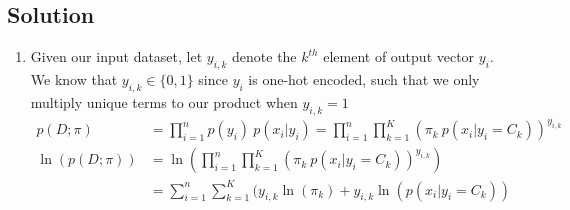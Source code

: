 \documentclass[submit]{harvardml}
\begin{document}
\subsection*{Solution}
\begin{enumerate}
    \item Given our input dataset, let $y_{i,k}$ denote the $k^{th}$ element of output vector $y_i$. We know that $y_{i,k} \in \{0, 1\}$ since $y_i$ is one-hot encoded, such that we only multiply unique terms to our product when  $y_{i,k}=1$
    \begin{align}
        p(D; \pi) &= \prod_{i=1}^n p(y_i) \ p(x_i | y_i)  = \prod_{i=1}^n \prod_{k=1}^K (\pi_k \ p(x_i | y_i = C_k))^{y_{i,k}} \\
        \ln(p(D; \pi)) &= \ln(\prod_{i=1}^n \prod_{k=1}^K (\pi_k \ p(x_i | y_i = C_k))^{y_{i,k}}) \\
        &= \sum_{i=1}^n \sum_{k=1}^K (y_{i,k}\ln(\pi_k) + y_{i,k}\ln(p(x_i | y_i = C_k))
    \end{align}
    

\end{enumerate}
\end{document}
